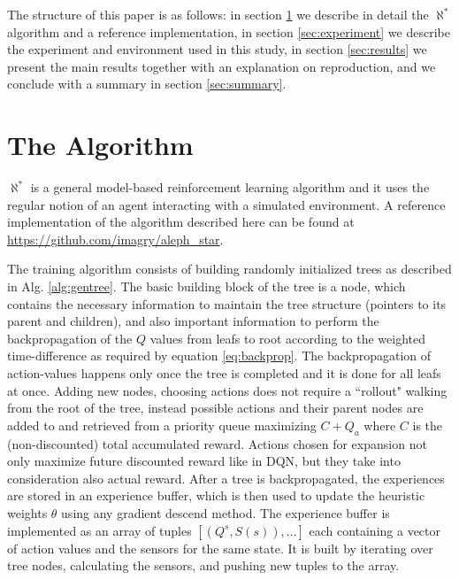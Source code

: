 \documentclass{article}
\newcommand{\alephstar}{$\aleph^*$ }
\begin{document}
The structure of this paper is as follows: in section \ref{sec:algorithm} we describe in detail the \alephstar algorithm and a reference implementation, in section \ref{sec:experiment} we describe the experiment and environment used in this study, in section \ref{sec:results} we present the main results together with an explanation on reproduction, and we conclude with a summary in section \ref{sec:summary}. 

\section{The Algorithm}
\label{sec:algorithm}

\alephstar is a general model-based reinforcement learning algorithm and it uses the regular notion of an agent interacting with a simulated environment. A reference implementation of the algorithm described here can be found at \url{https://github.com/imagry/aleph_star}.

The training algorithm consists of building randomly initialized trees as described in Alg. \ref{alg:gentree}. The basic building block of the tree is a node, which contains the necessary information to maintain the tree structure (pointers to its parent and children), and also important information to perform the backpropagation of the $Q$ values from leafs to root according to the weighted time-difference as required by equation \ref{eq:backprop}. The backpropagation of action-values happens only once the tree is completed and it is done for all leafs at once. Adding new nodes, choosing actions does not require a ``rollout" walking from the root of the tree, instead possible actions and their parent nodes are added to and retrieved from a priority queue maximizing $C+Q_a$ where $C$ is the (non-discounted) total accumulated reward. Actions chosen for expansion not only maximize future discounted reward like in DQN, but they take into consideration also actual reward. After a tree is backpropagated, the experiences are stored in an experience buffer, which is then used to update the heuristic weights $\theta$ using any gradient descend method. The experience buffer is implemented as an array of tuples $[(Q^s, S(s)), \ldots]$ each containing a vector of action values and the sensors for the same state. It is built by iterating over tree nodes, calculating the sensors, and pushing new tuples to the array.
\end{document}
